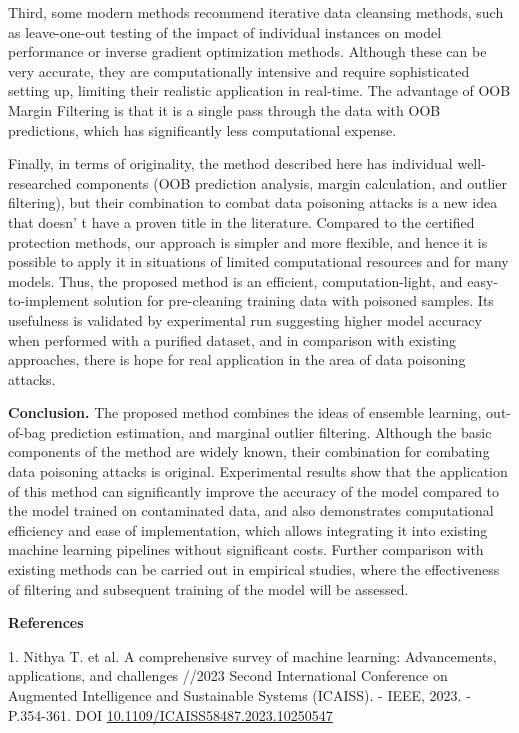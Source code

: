 Third, some modern methods recommend iterative data cleansing methods,
such as leave-one-out testing of the impact of individual instances on
model performance or inverse gradient optimization methods. Although
these can be very accurate, they are computationally intensive and
require sophisticated setting up, limiting their realistic application
in real-time. The advantage of OOB Margin Filtering is that it is a
single pass through the data with OOB predictions, which has
significantly less computational expense.

Finally, in terms of originality, the method described here has
individual well-researched components (OOB prediction analysis, margin
calculation, and outlier filtering), but their combination to combat
data poisoning attacks is a new idea that doesn' t have a
proven title in the literature. Compared to the certified protection
methods, our approach is simpler and more flexible, and hence it is
possible to apply it in situations of limited computational resources
and for many models. Thus, the proposed method is an efficient,
computation-light, and easy-to-implement solution for pre-cleaning
training data with poisoned samples. Its usefulness is validated by
experimental run suggesting higher model accuracy when performed with a
purified dataset, and in comparison with existing approaches, there is
hope for real application in the area of data poisoning attacks.

{\bfseries Conclusion.} The proposed method combines the ideas of ensemble
learning, out-of-bag prediction estimation, and marginal outlier
filtering. Although the basic components of the method are widely known,
their combination for combating data poisoning attacks is original.
Experimental results show that the application of this method can
significantly improve the accuracy of the model compared to the model
trained on contaminated data, and also demonstrates computational
efficiency and ease of implementation, which allows integrating it into
existing machine learning pipelines without significant costs. Further
comparison with existing methods can be carried out in empirical
studies, where the effectiveness of filtering and subsequent training of
the model will be assessed.

{\bfseries References}

1. Nithya T. et al. A comprehensive survey of machine learning:
Advancements, applications, and challenges //2023 Second International
Conference on Augmented Intelligence and Sustainable Systems (ICAISS). -
IEEE, 2023. - P.354-361. DOI
\href{http://dx.doi.org/10.1109/ICAISS58487.2023.10250547}{10.1109/ICAISS58487.2023.10250547}

